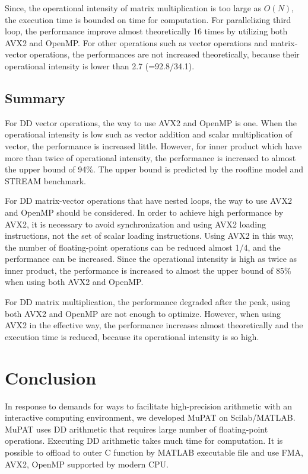 \documentclass{IOS-Book-Article}
\begin{document}
Since, the operational intensity of matrix multiplication is too large as $O(N)$, the execution time is bounded on time for computation. For parallelizing third loop, the performance improve almost theoretically 16 times by utilizing both AVX2 and OpenMP.
For other operations such as vector operations and matrix-vector operations, the performances are not increased theoretically, because their operational intensity is lower than 2.7 (=92.8/34.1). %



\subsection{Summary}

For DD vector operations, the way to use AVX2 and OpenMP is one. When the operational intensity is low  such as vector addition and scalar multiplication of vector, the performance is increased little. However, for inner product which have more than twice of operational intensity, the performance is increased to almost the upper bound of 94\%. The upper bound is predicted by the roofline model and STREAM benchmark.

For DD matrix-vector operations that have nested loops, the way to use AVX2 and OpenMP should be considered. In order to achieve high performance by AVX2, it is necessary to avoid synchronization and using AVX2 loading instructions, not the set of scalar loading instructions. Using AVX2 in this way, the number of floating-point operations can be reduced almost 1/4, and the performance can be increased. Since the operational intensity is high as twice as inner product, the performance is increased to almost the upper bound of 85\% when using both AVX2 and OpenMP. 

For DD matrix multiplication, the performance degraded after the peak, using both AVX2 and OpenMP are not enough to optimize. However, when using AVX2 in the effective way, the performance increases almost theoretically and the execution time is reduced, because its operational intensity is so high.

\section{Conclusion}
In response to demands for ways to facilitate high-precision arithmetic with an interactive computing environment, we developed MuPAT on Scilab/MATLAB. MuPAT uses DD arithmetic that requires large number of floating-point operations. Executing DD arithmetic takes much time for computation. It is possible to offload to outer C function by MATLAB executable file and use FMA, AVX2, OpenMP supported by modern CPU. 
\end{document}
